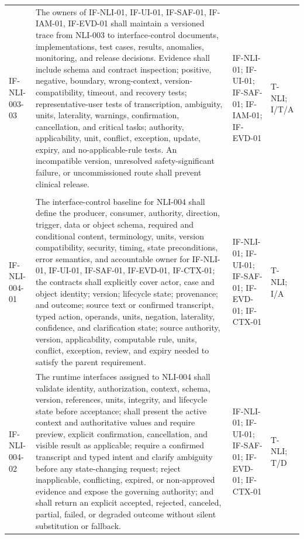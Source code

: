 \documentclass[11pt,letterpaper]{article}
\begin{document}
\begin{scriptsize}
\begin{longtable}{@{}L{0.14\textwidth}L{0.49\textwidth}L{0.19\textwidth}L{0.10\textwidth}@{}}
\addlinespace[2pt]
\mbox{IF-NLI-003-03} & The owners of IF-NLI-01, IF-UI-01, IF-SAF-01, IF-IAM-01, IF-EVD-01 shall maintain a versioned trace from NLI-003 to interface-control documents, implementations, test cases, results, anomalies, monitoring, and release decisions. Evidence shall include schema and contract inspection; positive, negative, boundary, wrong-context, version-compatibility, timeout, and recovery tests; representative-user tests of transcription, ambiguity, units, laterality, warnings, confirmation, cancellation, and critical tasks; authority, applicability, unit, conflict, exception, update, expiry, and no-applicable-rule tests. An incompatible version, unresolved safety-significant failure, or uncommissioned route shall prevent clinical release. & IF-NLI-01; IF-UI-01; IF-SAF-01; IF-IAM-01; IF-EVD-01 & T-NLI; I\slash\allowbreak{}T\slash\allowbreak{}A \\
\addlinespace[2pt]
 \\
\addlinespace[2pt]
\mbox{IF-NLI-004-01} & The interface-control baseline for NLI-004 shall define the producer, consumer, authority, direction, trigger, data or object schema, required and conditional content, terminology, units, version compatibility, security, timing, state preconditions, error semantics, and accountable owner for IF-NLI-01, IF-UI-01, IF-SAF-01, IF-EVD-01, IF-CTX-01; the contracts shall explicitly cover actor, case and object identity; version; lifecycle state; provenance; and outcome; source text or confirmed transcript, typed action, operands, units, negation, laterality, confidence, and clarification state; source authority, version, applicability, computable rule, units, conflict, exception, review, and expiry needed to satisfy the parent requirement. & IF-NLI-01; IF-UI-01; IF-SAF-01; IF-EVD-01; IF-CTX-01 & T-NLI; I\slash\allowbreak{}A \\
\addlinespace[2pt]
\mbox{IF-NLI-004-02} & The runtime interfaces assigned to NLI-004 shall validate identity, authorization, context, schema, version, references, units, integrity, and lifecycle state before acceptance; shall present the active context and authoritative values and require preview, explicit confirmation, cancellation, and visible result as applicable; require a confirmed transcript and typed intent and clarify ambiguity before any state-changing request; reject inapplicable, conflicting, expired, or non-approved evidence and expose the governing authority; and shall return an explicit accepted, rejected, canceled, partial, failed, or degraded outcome without silent substitution or fallback. & IF-NLI-01; IF-UI-01; IF-SAF-01; IF-EVD-01; IF-CTX-01 & T-NLI; T\slash\allowbreak{}D \\

\end{longtable}
\end{scriptsize}
\end{document}

